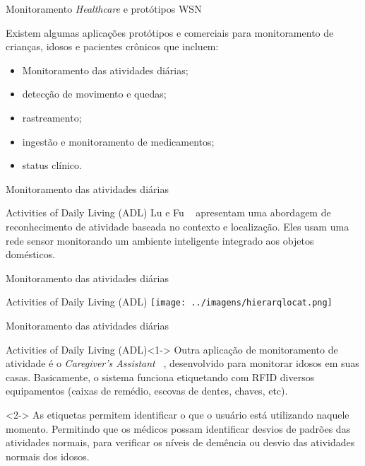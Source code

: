 \documentclass{beamer}
\begin{document}
\begin{frame}{Monitoramento \textit{Healthcare} e protótipos WSN}
  \begin{block}{}
    Existem algumas aplicações protótipos e comerciais para monitoramento de crianças, idosos e pacientes crônicos que incluem:
      \begin{itemize}[<+->]
       \item Monitoramento das atividades diárias;
       \item detecção de movimento e quedas;
       \item rastreamento;
       \item ingestão e monitoramento de medicamentos;
       \item status clínico.
      \end{itemize}
  \end{block}
\end{frame}


\begin{frame}{Monitoramento das atividades diárias}
  \begin{block}{Activities of Daily Living (ADL)}
    Lu e Fu ~\cite{lu} apresentam uma abordagem de reconhecimento de atividade baseada no contexto e localização. Eles usam uma rede sensor monitorando um ambiente inteligente integrado aos objetos domésticos.
  \end{block}
\end{frame}


\begin{frame}{Monitoramento das atividades diárias} 
    \begin{block}{Activities of Daily Living (ADL)}
      \center \texttt{[image: ../imagens/hierarqlocat.png]}
    \end{block}
\end{frame}

\begin{frame}{Monitoramento das atividades diárias}
  \begin{block}{Activities of Daily Living (ADL)}<1->
    Outra aplicação de monitoramento de atividade é o \textit{Caregiver’s Assistant} ~\cite{phi04}, desenvolvido para monitorar idosos em suas casas. Basicamente, o sistema funciona etiquetando com RFID diversos equipamentos (caixas de remédio, escovas de dentes, chaves, etc). 
  \end{block}

  \begin{block}{}<2->
   As etiquetas permitem identificar o que o usuário está utilizando naquele momento. Permitindo que os médicos possam identificar desvios de padrões das atividades normais, para verificar os níveis de demência ou desvio das atividades normais dos idosos.
  \end{block}
\end{frame}
\end{document}
